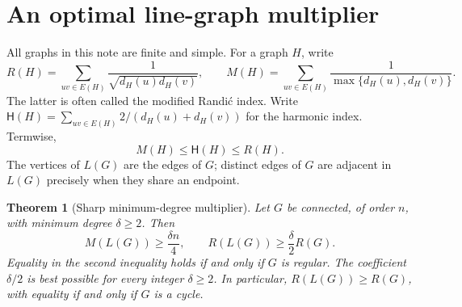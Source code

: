 \documentclass[11pt]{article}
\newtheorem{theorem}{Theorem}[section]
\theoremstyle{remark}\newtheorem{remark}[theorem]{Remark}
\begin{document}
\section{An optimal line-graph multiplier}

All graphs in this note are finite and simple. For a graph $H$, write
\[
 R(H)=\sum_{uv\in E(H)}\frac1{\sqrt{d_H(u)d_H(v)}},\qquad
 M(H)=\sum_{uv\in E(H)}\frac1{\max\{d_H(u),d_H(v)\}}.
\]
The latter is often called the modified Randi\'c index. Write
$\mathsf H(H)=\sum_{uv\in E(H)}2/(d_H(u)+d_H(v))$ for the harmonic index.
Termwise,
\begin{equation}\label{eq:index-chain}
 M(H)\le\mathsf H(H)\le R(H).
\end{equation}
The vertices of $L(G)$ are the edges of $G$; distinct edges of $G$ are
adjacent in $L(G)$ precisely when they share an endpoint.

\begin{theorem}[Sharp minimum-degree multiplier]\label{thm:graph}
Let $G$ be connected, of order $n$, with minimum degree $\delta\ge2$.
Then
\begin{equation}\label{eq:main-graph}
 M(L(G))\ge\frac{\delta n}{4},\qquad
 R(L(G))\ge\frac{\delta}{2}R(G).
\end{equation}
Equality in the second inequality holds if and only if $G$ is regular.
The coefficient $\delta/2$ is best possible for every integer $\delta\ge2$.
In particular, $R(L(G))\ge R(G)$, with equality if and only if $G$ is a cycle.
\end{theorem}
\end{document}

